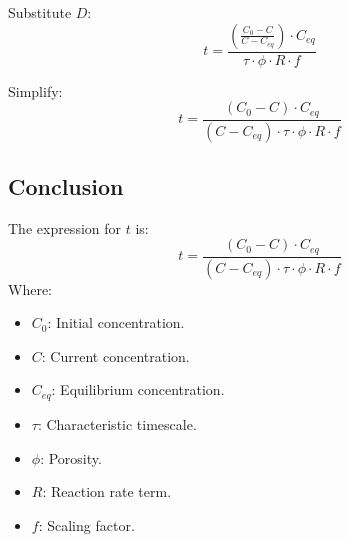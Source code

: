 Substitute $D$:
\[
t = \frac{\left(\frac{C_0 - C}{C - C_{eq}}\right) \cdot C_{eq}}{\tau \cdot \phi \cdot R \cdot f}
\]

Simplify:
\[
t = \frac{(C_0 - C) \cdot C_{eq}}{(C - C_{eq}) \cdot \tau \cdot \phi \cdot R \cdot f}
\]

\subsection{Conclusion}
The expression for $t$ is:
\[
t = \frac{(C_0 - C) \cdot C_{eq}}{(C - C_{eq}) \cdot \tau \cdot \phi \cdot R \cdot f}
\]
Where:
\begin{itemize}
    \item $C_0$: Initial concentration.
    \item $C$: Current concentration.
    \item $C_{eq}$: Equilibrium concentration.
    \item $\tau$: Characteristic timescale.
    \item $\phi$: Porosity.
    \item $R$: Reaction rate term.
    \item $f$: Scaling factor.
\end{itemize}
